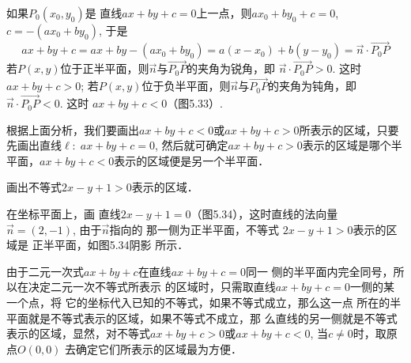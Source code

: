 \begin{figure}[htp]
    \centering
{}
    \caption{}
\end{figure}

如果$P_0(x_0,y_0)$是
直线$ax+by+c=0$上一点，则$ax_0+by_0+c=0$, $c=-(ax_0+by_0)$, 于是
\[ax+by+c=ax+by-(ax_0+by_0)=a(x-x_0)+b(y-y_0)=\vec{n}\cdot \Vec{P_0P}\]
若$P(x,y)$位于正半平面，则$\vec{n}$与$\Vec{P_0P}$的夹角为锐角，即
$\vec{n}\cdot \Vec{P_0P}>0$. 这时$ax+by+c>0$; 若$P(x,y)$位于负半平面，则$\vec{n}$与$\Vec{P_0P}$的夹角为钝角，即$\vec{n}\cdot \Vec{P_0P}<0$. 这时
$ax+by+c<0$（图5.33）.

根据上面分析，我们要画出$ax+by+c<0$或$ax+by
+c> 0$所表示的区域，只要先画出直线$\ell:\; ax+by+c=0$, 
然后就可确定$ax+by+c>0$表示的区域是哪个半平面，$ax
+by+c<0$表示的区域便是另一个半平面．

\begin{example}
    画出不等式$2x-y+1>0$表示的区域．
\end{example}

\begin{solution}
在坐标平面上，画
直线$2x-y+1=0$（图5.34），这时直线的法向量
$\vec{n}=(2,-1)$, 由于$\vec{n}$指向的
那一侧为正半平面，不等式
$2x-y+1>0$表示的区域是
正半平面，如图5.34阴影
所示．

由于二元一次式$ax+by+c$在直线$ax+by+c=0$同一
侧的半平面内完全同号，所以在决定二元一次不等式所表示
的区域时，只需取直线$ax+by+c=0$一侧的某一个点，将
它的坐标代入已知的不等式，如果不等式成立，那么这一点
所在的半平面就是不等式表示的区域，如果不等式不成立，那
么直线的另一侧就是不等式表示的区域，显然，对不等式$ax
+by+c>0$或$ax+by+c<0$, 当$c\ne 0$时，取原点$O(0,0)$
去确定它们所表示的区域最为方便．
\end{solution}


